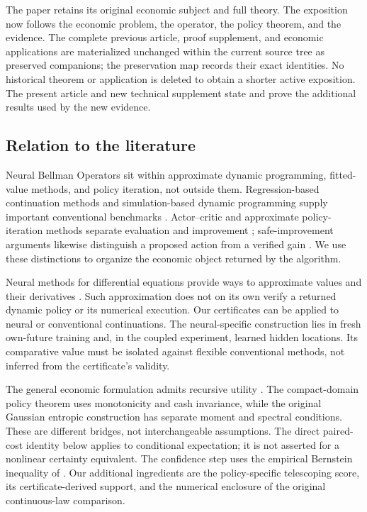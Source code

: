 \documentclass[ecta,nameyear,draft]{econsocart}
\begin{document}
The paper retains its original economic subject and full theory. The exposition now follows the economic problem, the operator, the policy theorem, and the evidence. The complete previous article, proof supplement, and economic applications are materialized unchanged within the current source tree as preserved companions; the preservation map records their exact identities. No historical theorem or application is deleted to obtain a shorter active exposition. The present article and new technical supplement state and prove the additional results used by the new evidence.

\subsection{Relation to the literature}
Neural Bellman Operators sit within approximate dynamic programming, fitted-value methods, and policy iteration, not outside them. Regression-based continuation methods and simulation-based dynamic programming supply important conventional benchmarks \citep{judd1998,powell2011,longstaff2001,ernst2005}. Actor--critic and approximate policy-iteration methods separate evaluation and improvement \citep{konda1999,scherrer2015}; safe-improvement arguments likewise distinguish a proposed action from a verified gain \citep{kakade2002,pirotta2013}. We use these distinctions to organize the economic object returned by the algorithm.

Neural methods for differential equations provide ways to approximate values and their derivatives \citep{sirignano2018,han2018,hornik1990}. Such approximation does not on its own verify a returned dynamic policy or its numerical execution. Our certificates can be applied to neural or conventional continuations. The neural-specific construction lies in fresh own-future training and, in the coupled experiment, learned hidden locations. Its comparative value must be isolated against flexible conventional methods, not inferred from the certificate's validity.

The general economic formulation admits recursive utility \citep{epsteinzin1989,duffieepstein1992}. The compact-domain policy theorem uses monotonicity and cash invariance, while the original Gaussian entropic construction has separate moment and spectral conditions. These are different bridges, not interchangeable assumptions. The direct paired-cost identity below applies to conditional expectation; it is not asserted for a nonlinear certainty equivalent. The confidence step uses the empirical Bernstein inequality of \citet{maurer2009}. Our additional ingredients are the policy-specific telescoping score, its certificate-derived support, and the numerical enclosure of the original continuous-law comparison.
\end{document}
